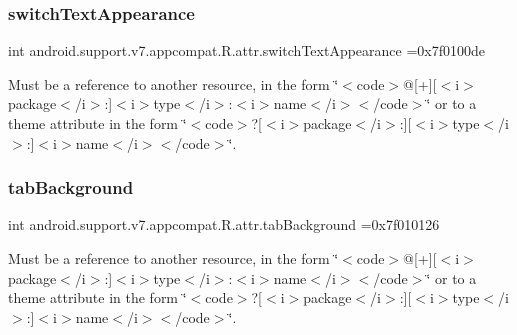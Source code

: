 \subsubsection{\texorpdfstring{switch\+Text\+Appearance}{switchTextAppearance}}
{\footnotesize\ttfamily int android.\+support.\+v7.\+appcompat.\+R.\+attr.\+switch\+Text\+Appearance =0x7f0100de\hspace{0.3cm}{\ttfamily [static]}}

Must be a reference to another resource, in the form \char`\"{}$<$code$>$@\mbox{[}+\mbox{]}\mbox{[}$<$i$>$package$<$/i$>$\+:\mbox{]}$<$i$>$type$<$/i$>$\+:$<$i$>$name$<$/i$>$$<$/code$>$\char`\"{} or to a theme attribute in the form \char`\"{}$<$code$>$?\mbox{[}$<$i$>$package$<$/i$>$\+:\mbox{]}\mbox{[}$<$i$>$type$<$/i$>$\+:\mbox{]}$<$i$>$name$<$/i$>$$<$/code$>$\char`\"{}. \mbox{\label{classandroid_1_1support_1_1v7_1_1appcompat_1_1R_1_1attr_a71cdff75d6b555ac21d02a8b344827ad}} 
\subsubsection{\texorpdfstring{tab\+Background}{tabBackground}}
{\footnotesize\ttfamily int android.\+support.\+v7.\+appcompat.\+R.\+attr.\+tab\+Background =0x7f010126\hspace{0.3cm}{\ttfamily [static]}}

Must be a reference to another resource, in the form \char`\"{}$<$code$>$@\mbox{[}+\mbox{]}\mbox{[}$<$i$>$package$<$/i$>$\+:\mbox{]}$<$i$>$type$<$/i$>$\+:$<$i$>$name$<$/i$>$$<$/code$>$\char`\"{} or to a theme attribute in the form \char`\"{}$<$code$>$?\mbox{[}$<$i$>$package$<$/i$>$\+:\mbox{]}\mbox{[}$<$i$>$type$<$/i$>$\+:\mbox{]}$<$i$>$name$<$/i$>$$<$/code$>$\char`\"{}. \mbox{\label{classandroid_1_1support_1_1v7_1_1appcompat_1_1R_1_1attr_a9c7686f50ebedc57677affd040baeb34}} 
